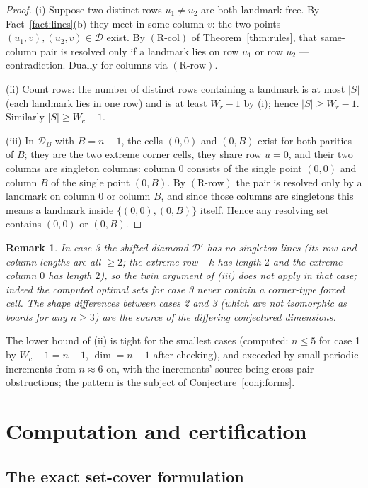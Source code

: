 \documentclass[12pt]{article}
\newtheorem{remark}[theorem]{Remark}
\theoremstyle{definition}
\newcommand{\DD}{\mathcal{D}}
\newcommand{\DDs}{\mathcal{D}'}
\newcommand{\RRc}{\ensuremath{\mathrm{(R\text{-}col)}}}
\newcommand{\RRr}{\ensuremath{\mathrm{(R\text{-}row)}}}
\begin{document}
\begin{proof}
(i) Suppose two distinct rows $u_1\neq u_2$ are both landmark-free. By Fact~\ref{fact:lines}(b) they meet in some column $v$: the two points $(u_1,v),(u_2,v)\in\DD$ exist. By \RRc{} of Theorem~\ref{thm:rules}, that same-column pair is resolved only if a landmark lies on row $u_1$ or row $u_2$ --- contradiction. Dually for columns via \RRr.

(ii) Count rows: the number of distinct rows containing a landmark is at most $|S|$ (each landmark lies in one row) and is at least $W_r-1$ by (i); hence $|S|\ge W_r-1$. Similarly $|S|\ge W_c-1$.

(iii) In $\DD_B$ with $B=n-1$, the cells $(0,0)$ and $(0,B)$ exist for both parities of $B$; they are the two extreme corner cells, they share row $u=0$, and their two columns are singleton columns: column $0$ consists of the single point $(0,0)$ and column $B$ of the single point $(0,B)$. By \RRr{} the pair is resolved only by a landmark on column $0$ or column $B$, and since those columns are singletons this means a landmark inside $\{(0,0),(0,B)\}$ itself. Hence any resolving set contains $(0,0)$ or $(0,B)$.
\end{proof}

\begin{remark}
In case 3 the shifted diamond $\DDs$ has \emph{no} singleton lines (its row and column lengths are all $\ge2$; the extreme row $-k$ has length $2$ and the extreme column $0$ has length $2$), so the twin argument of (iii) does not apply in that case; indeed the computed optimal sets for case 3 never contain a corner-type forced cell. The shape differences between cases 2 and 3 (which are \emph{not} isomorphic as boards for any $n\ge3$) are the source of the differing conjectured dimensions.
\end{remark}

The lower bound of (ii) is tight for the smallest cases (computed: $n\le5$ for case 1 by $W_c-1=n-1$, $\dim=n-1$ after checking), and exceeded by small periodic increments from $n\approx6$ on, with the increments' source being cross-pair obstructions; the pattern is the subject of Conjecture~\ref{conj:forms}.

\section{Computation and certification}\label{sec:computation}

\subsection{The exact set-cover formulation}
\end{document}
